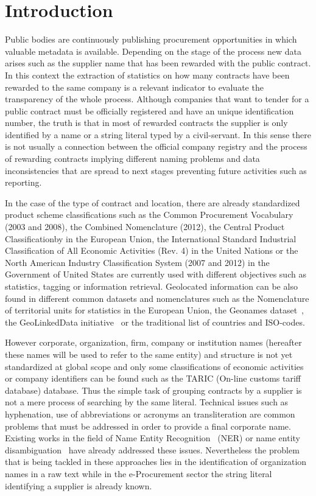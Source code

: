 \documentclass{llncs}
\begin{document}
\section{Introduction}
Public bodies are continuously publishing procurement opportunities in which 
valuable metadata is available. Depending on the stage of the process new data arises such 
as the supplier name that has been rewarded with the public contract. In this 
context the extraction of statistics on how many contracts have been 
rewarded to the same company is a relevant indicator to evaluate the transparency 
of the whole process. Although companies that want to tender for a public contract must be 
officially registered and have an unique identification number, the truth is 
that in most of rewarded contracts the supplier is only identified by a name or a string literal typed 
by a civil-servant. In this sense there is not usually a connection between 
the official company registry and the process of rewarding contracts implying different 
naming problems and data inconsistencies that are spread to next stages preventing future 
activities such as reporting.

In the case of the type of contract and location, there are already standardized~\cite{DBLP:journals/ijseke/AlvarezLSASL12} product 
scheme classifications such as the Common Procurement Vocabulary (2003 and 2008), the Combined Nomenclature (2012), 
the Central Product Classificationby in the European Union, the International Standard Industrial Classification of 
All Economic Activities (Rev. 4) in the United Nations or the North American Industry Classification System (2007 and 2012) 
in the Government of United States are currently used with different objectives such as statistics, tagging or 
information retrieval. Geolocated information can be also found in different common datasets and nomenclatures such as 
the Nomenclature of territorial units for statistics in the European Union, the Geonames dataset~\cite{Geonames}, the GeoLinkedData 
initiative~\cite{DBLP:conf/dexa/Lopez-PellicerSCZM10} or the traditional list of countries and ISO-codes.

However corporate, organization, firm, company or institution names (hereafter these names will be used to refer to 
the same entity) and structure is not yet standardized at global scope and only some classifications of economic activities or 
company identifiers can be found such as the TARIC (On-line customs tariff database) database. Thus the simple task of grouping contracts by a supplier is not a mere process of 
searching by the same literal. Technical issues such as hyphenation, use of abbreviations or acronyms an transliteration are common problems that must be addressed in order 
to provide a final corporate name. Existing works in the field of Name Entity Recognition~\cite{citeulike:1657521} (NER) or 
name entity disambiguation~\cite{Sarmento:2009:AWN:1602022.1602085,Klein:2003:NER:1119176.1119204} have already addressed these issues. 
Nevertheless the problem that is being tackled in these approaches lies in the identification of organization names in 
a raw text while in the e-Procurement sector the string literal identifying a supplier is already known.
\end{document}
